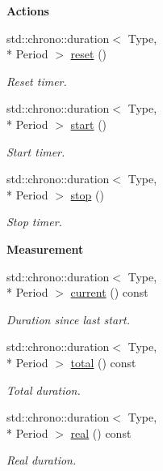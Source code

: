 \begin{Indent}{\bf Actions}\par
\begin{DoxyCompactItemize}
\item 
std\-::chrono\-::duration$<$ Type, \\*
Period $>$ \hyperlink{exceptionmagrathea_1_1Timer_a76a3e527e10929ce89ea8dce211ed5d3}{reset} ()
\begin{DoxyCompactList}\small\item\em Reset timer. \end{DoxyCompactList}\item 
std\-::chrono\-::duration$<$ Type, \\*
Period $>$ \hyperlink{exceptionmagrathea_1_1Timer_aa5ff5a3ddd22202435d2bf149cf0c1de}{start} ()
\begin{DoxyCompactList}\small\item\em Start timer. \end{DoxyCompactList}\item 
std\-::chrono\-::duration$<$ Type, \\*
Period $>$ \hyperlink{exceptionmagrathea_1_1Timer_a178fa98482e7240a799fc438a16e37ea}{stop} ()
\begin{DoxyCompactList}\small\item\em Stop timer. \end{DoxyCompactList}\end{DoxyCompactItemize}
\end{Indent}
\begin{Indent}{\bf Measurement}\par
\begin{DoxyCompactItemize}
\item 
std\-::chrono\-::duration$<$ Type, \\*
Period $>$ \hyperlink{exceptionmagrathea_1_1Timer_a774c96d0d0ffb1ccc02dac73d65f6709}{current} () const 
\begin{DoxyCompactList}\small\item\em Duration since last start. \end{DoxyCompactList}\item 
std\-::chrono\-::duration$<$ Type, \\*
Period $>$ \hyperlink{exceptionmagrathea_1_1Timer_ab17dc88ef072205f472d387f4dea1033}{total} () const 
\begin{DoxyCompactList}\small\item\em Total duration. \end{DoxyCompactList}\item 
std\-::chrono\-::duration$<$ Type, \\*
Period $>$ \hyperlink{exceptionmagrathea_1_1Timer_a6e4a9f49df93c2620c4703fad36b1678}{real} () const 
\begin{DoxyCompactList}\small\item\em Real duration. \end{DoxyCompactList}\end{DoxyCompactItemize}
\end{Indent}
